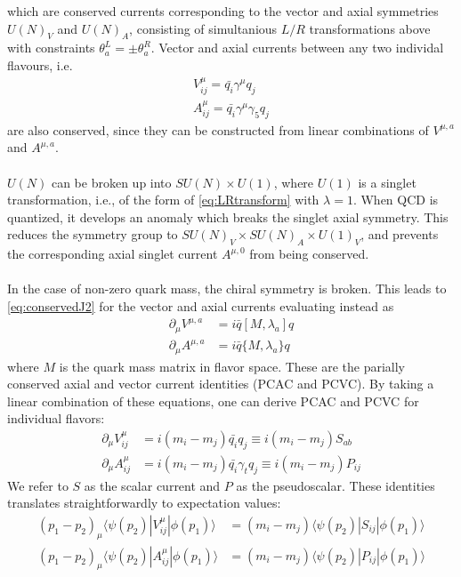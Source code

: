 \documentclass[a4paper,10pt]{article}
\numberwithin{equation}{section}
\begin{document}
which are conserved currents corresponding to the vector and axial symmetries $U(N)_V$ and $U(N)_A$, consisting of simultanious $L/R$ transformations above with constraints $\theta_a^{L} = \pm \theta_a^{R}$. Vector and axial currents between any two individal flavours, i.e.
\begin{align}
	\label{eq:individualflavs1}
	V^{\mu}_{ij} = \bar{q_i} \gamma^{\mu} q_j \\
	A^{\mu}_{ij} = \bar{q_i} \gamma^{\mu} \gamma_5 q_j
	\label{eq:individualflavs2}
\end{align}
are also conserved, since they can be constructed from linear combinations of $V^{\mu,a}$ and $A^{\mu,a}$.
\\ \\
$U(N)$ can be broken up into $SU(N)\times U(1)$, where $U(1)$ is a singlet transformation, i.e., of the form of \eqref{eq:LRtransform} with $\lambda = 1$. When QCD is quantized, it develops an anomaly which breaks the singlet axial symmetry. This reduces the symmetry group to $SU(N)_V\times SU(N)_A\times U(1)_V$, and prevents the corresponding axial singlet current $A^{\mu,0}$ from being conserved.
\\ \\
In the case of non-zero quark mass, the chiral symmetry is broken. This leads to \eqref{eq:conservedJ2} for the vector and axial currents evaluating instead as
\begin{align}
	\partial_{\mu} V^{\mu,a} &= i\bar{q} [ M,  \lambda_a ] q \\
	\partial_{\mu} A^{\mu,a} &= i\bar{q} \{ M, \lambda_a \} q 
\end{align}
where $M$ is the quark mass matrix in flavor space. These are the parially conserved axial and vector current identities (PCAC and PCVC). By taking a linear combination of these equations, one can derive PCAC and PCVC for individual flavors:
\begin{align}
	\partial_{\mu} V_{ij}^{\mu} &= i(m_i - m_j) \bar{q_i} q_j \equiv i(m_i - m_j) S_{ab} \\
	\partial_{\mu} A_{ij}^{\mu} &= i(m_i - m_j) \bar{q_i} \gamma_t q_j \equiv i(m_i - m_j) P_{ij}
\end{align}
We refer to $S$ as the scalar current and $P$ as the pseudoscalar. These identities translates straightforwardly to expectation values:
\begin{align}
	\label{eq:PCVC}
	(p_1 - p_2)_{\mu} \langle \psi(p_2) | V^{\mu}_{ij} | \phi(p_1) \rangle &= (m_i - m_j) \langle \psi(p_2) | S_{ij} | \phi(p_1) \rangle \\
	(p_1 - p_2)_{\mu} \langle \psi(p_2) | A^{\mu}_{ij} | \phi(p_1) \rangle &= (m_i - m_j) \langle \psi(p_2) | P_{ij} | \phi(p_1) \rangle
\end{align}
\end{document}
